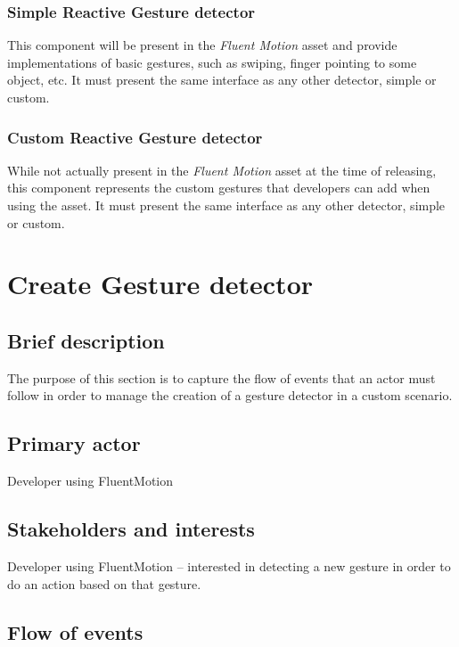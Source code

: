 \documentclass[12pt,a4paper,twoside]{report}
\begin{document}
\subsubsection{Simple Reactive Gesture detector}
This component will be present in the \textit{Fluent Motion} asset and provide implementations of basic gestures, such as swiping, finger pointing to some object, etc. It must present the same interface as any other detector, simple or custom.

\subsubsection{Custom Reactive Gesture detector}
While not actually present in the \textit{Fluent Motion} asset at the time of releasing, this component represents the custom gestures that developers can add when using the asset. It must present the same interface as any other detector, simple or custom.

\section{Create Gesture detector}

\subsection{Brief description}

The purpose of this section is to capture the flow of events that an actor must follow in order to manage the creation of a gesture detector in a custom scenario.

\subsection{Primary actor}

Developer using FluentMotion

\subsection{Stakeholders and interests}

Developer using FluentMotion – interested in detecting a new gesture in order to do an action based on that gesture.

\subsection{Flow of events}
\end{document}
